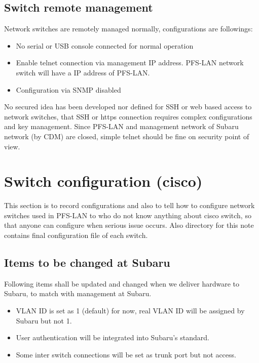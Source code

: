 \documentclass[a4paper,notitlepage]{article}
\begin{document}
\subsection{Switch remote management}

Network switches are remotely managed normally, configurations are followings: 

\begin{itemize}
  \item No serial or USB console connected for normal operation
  \item Enable telnet connection via management IP address. PFS-LAN network 
    switch will have a IP address of PFS-LAN.
  \item Configuration via SNMP disabled
\end{itemize}

No secured idea has been developed nor defined for SSH or web based access to 
network switches, that SSH or https connection requires complex configurations 
and key management. Since PFS-LAN and management network of Subaru network (by 
CDM) are closed, simple telnet should be fine on security point of view.

\section{Switch configuration (cisco)}

This section is to record configurations and also to tell how to configure 
network switches used in PFS-LAN to who do not know anything about cisco 
switch, so that anyone can configure when serious issue occurs. 
Also directory for this note contains final configuration file of each 
switch.

\subsection{Items to be changed at Subaru}

Following items shall be updated and changed when we deliver hardware to 
Subaru, to match with management at Subaru. 

\begin{itemize}
  \item VLAN ID is set as 1 (default) for now, real VLAN ID will be assigned 
    by Subaru but not 1.
  \item User authentication will be integrated into Subaru's standard.
  \item Some inter switch connections will be set as trunk port but not access.
\end{itemize}
\end{document}
